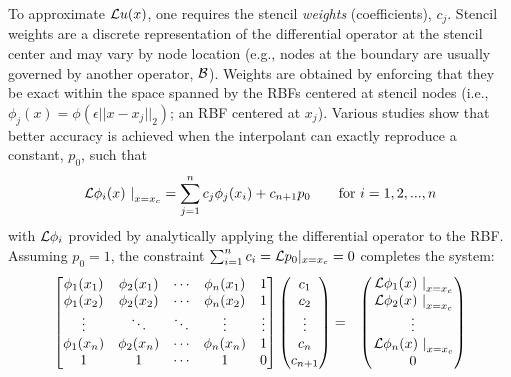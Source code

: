 \documentclass[11pt]{report}
\begin{document}
{ To approximate $\mathcal{L}u(x)$, one requires the stencil \emph{weights} (coefficients), ${c_j}$. Stencil weights are a discrete representation of the differential operator at the stencil center and may vary by node location (e.g., nodes at the boundary are usually governed by another operator, $\boundop$). Weights are obtained by enforcing that they be exact within the space spanned by the RBFs centered at stencil nodes (i.e., $\phi_j(x) = \phi(\epsilon ||x-x_j||_2)$; an RBF centered at $x_j$). Various studies  \cite{WrightFornberg06,FornbergDriscoll02,FornbergLehto11,FlyerLehto11} show that better accuracy is achieved when the 
interpolant can exactly reproduce a constant, $p_0$, such that	\begin{align*}
	       \left. \mathcal{L}\phi_i(x) \ \right|_{x=x_c} = \sum_{j=1}^{n} c_j \phi_j(x_i) + c_{n+1} p_0 \ \ \ \ \ \ \textrm{for }i=1,2,...,n  
	\end{align*}
	with $\mathcal{L}\phi_i$ provided by analytically applying the differential operator to the RBF. Assuming $p_0 = 1$, the constraint $\sum_{i=1}^{n}c_i=\mathcal{L}p_0|_{x=x_{c}}=0$ completes the system: 
	\begin{eqnarray}        
          \begin{bmatrix} \phi_1(x_1) & \phi_2(x_1) & \cdots & \phi_n(x_{1}) & 1 \\ 
            \phi_1(x_2) & \phi_2(x_2) & \cdots & \phi_n(x_{2}) & 1\\ 
            \vdots & \ddots & \ddots & \vdots & \vdots \\ 
            \phi_{1}(x_n) & \phi_{2}(x_n) & \cdots & \phi_{n}(x_{n}) & 1 
            \\ 1 & 1 & \cdots & 1 & 0 \end{bmatrix} 
            \begin{pmatrix} c_1 \\ c_2 \\ \vdots \\ c_n \\ c_{n+1} \end{pmatrix} & = & \begin{pmatrix} \left.\diffop{\phi_1}(x)\ \right|_{x=x_c} \\  \left.\diffop{\phi_2}(x)\ \right|_{x=x_c} \\ \vdots \\  \left.\diffop{\phi_{n}}(x)\ \right|_{x=x_c} \\ 0 \end{pmatrix} \label{eq:rbffd_weight_system} \\

\end{eqnarray}}
\end{document}
